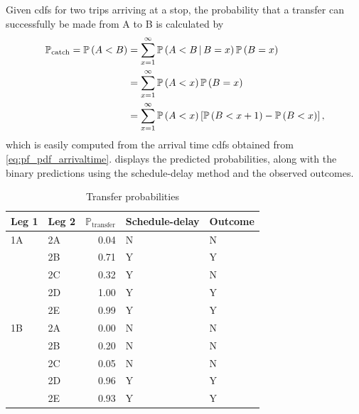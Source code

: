 Given \glspl{cdf} for two trips arriving at a stop, the probability that a transfer can successfully be made from A to B is calculated by
\begin{equation}
\label{eq:eta_total_prob}
\begin{split}
\mathbb{P}_\text{catch} =
\mathbb{P}\left(A < B\right) &= \sum_{x=1}^{\infty} \mathbb{P}\left(A < B\,|\,B = x\right)\mathbb{P}\left(B=x\right) \\
  &= \sum_{x=1}^\infty
    \mathbb{P}\left(A < x\right) \mathbb{P}\left(B=x\right) \\
  &= \sum_{x=1}^\infty
    \mathbb{P}\left(A < x\right) \left[
      \mathbb{P}\left(B < x + 1\right) - \mathbb{P}\left(B < x\right)
    \right],
\end{split}
\end{equation}
which is easily computed from the arrival time \glspl{cdf} obtained from \cref{eq:pf_pdf_arrivaltime}.  displays the predicted probabilities, along with the binary predictions using the schedule-delay method and the observed outcomes.


\begin{knitrout}\small
{}\color{fgcolor}\begin{table}

\caption{\label{tab:eta_journey_transfer_res}Transfer probabilities}
\centering
\fontsize{8}{10}\selectfont
\begin{tabular}[t]{llrll}
\toprule
Leg 1 & Leg 2 & $\mathbb{P}_\text{transfer}$ & Schedule-delay & Outcome\\
\midrule
1A & 2A & 0.04 & N & N\\
 & 2B & 0.71 & Y & Y\\
 & 2C & 0.32 & Y & N\\
 & 2D & 1.00 & Y & Y\\
 & 2E & 0.99 & Y & Y\\
\midrule
1B & 2A & 0.00 & N & N\\
 & 2B & 0.20 & N & N\\
 & 2C & 0.05 & N & N\\
 & 2D & 0.96 & Y & Y\\
 & 2E & 0.93 & Y & Y\\
\bottomrule
\end{tabular}
\end{table}


\end{knitrout}


